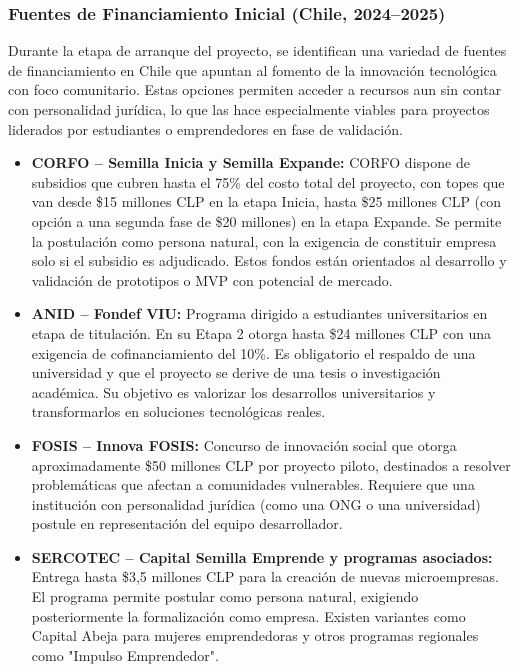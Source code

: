 \documentclass[12pt]{article}
\begin{document}
\subsubsection{Fuentes de Financiamiento Inicial (Chile, 2024–2025)}

Durante la etapa de arranque del proyecto, se identifican una variedad de fuentes de financiamiento en Chile que apuntan al fomento de la innovación tecnológica con foco comunitario. Estas opciones permiten acceder a recursos aun sin contar con personalidad jurídica, lo que las hace especialmente viables para proyectos liderados por estudiantes o emprendedores en fase de validación.

\begin{itemize}
    \item \textbf{CORFO – Semilla Inicia y Semilla Expande:} CORFO dispone de subsidios que cubren hasta el 75\% del costo total del proyecto, con topes que van desde \$15 millones CLP en la etapa Inicia, hasta \$25 millones CLP (con opción a una segunda fase de \$20 millones) en la etapa Expande. Se permite la postulación como persona natural, con la exigencia de constituir empresa solo si el subsidio es adjudicado. Estos fondos están orientados al desarrollo y validación de prototipos o MVP con potencial de mercado.
    \item \textbf{ANID – Fondef VIU:} Programa dirigido a estudiantes universitarios en etapa de titulación. En su Etapa 2 otorga hasta \$24 millones CLP con una exigencia de cofinanciamiento del 10\%. Es obligatorio el respaldo de una universidad y que el proyecto se derive de una tesis o investigación académica. Su objetivo es valorizar los desarrollos universitarios y transformarlos en soluciones tecnológicas reales.
    \newpage
    \item \textbf{FOSIS – Innova FOSIS:} Concurso de innovación social que otorga aproximadamente \$50 millones CLP por proyecto piloto, destinados a resolver problemáticas que afectan a comunidades vulnerables. Requiere que una institución con personalidad jurídica (como una ONG o una universidad) postule en representación del equipo desarrollador.
    \item \textbf{SERCOTEC – Capital Semilla Emprende y programas asociados:} Entrega hasta \$3,5 millones CLP para la creación de nuevas microempresas. El programa permite postular como persona natural, exigiendo posteriormente la formalización como empresa. Existen variantes como Capital Abeja para mujeres emprendedoras y otros programas regionales como "Impulso Emprendedor".

\end{itemize}
\end{document}

